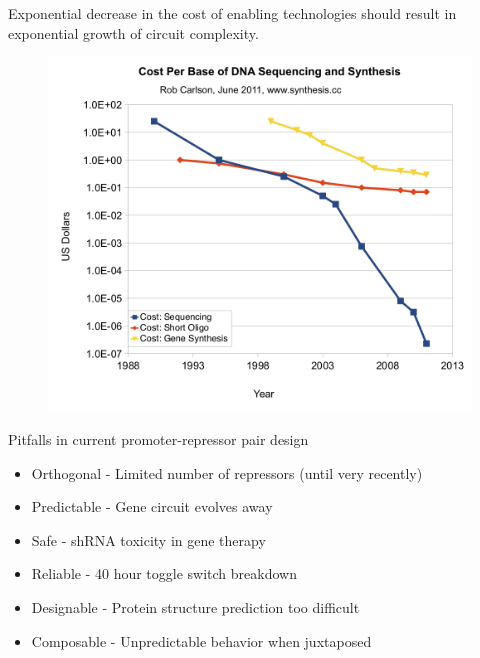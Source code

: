 \documentclass{beamer}
\begin{document}
\begin{frame}
Exponential decrease in the cost of enabling technologies should result 
in exponential growth of circuit complexity.

\begin{figure}
  \centering
  \includegraphics[scale=0.5]{cost_per_base.png}
\end{figure}
\end{frame}

\begin{frame}
\begin{block}{Pitfalls in current promoter-repressor pair design}
  \begin{itemize}
    \item Orthogonal  - Limited number of repressors (until very recently)
    \item Predictable - Gene circuit evolves away
    \item Safe        - shRNA toxicity in gene therapy
    \item Reliable    - 40 hour toggle switch breakdown
    \item Designable  - Protein structure prediction too difficult
    \item Composable - Unpredictable behavior when juxtaposed
  \end{itemize}
\end{block}

\end{frame}

\end{document}
